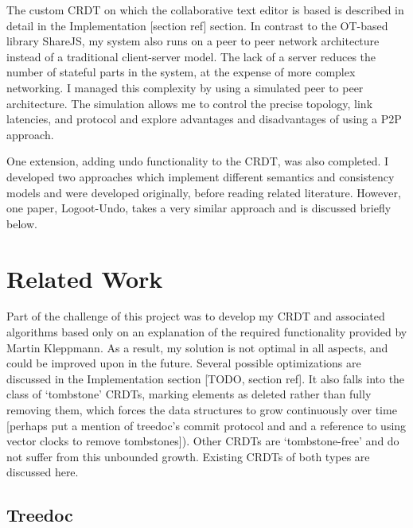\documentclass[12pt,a4paper,twoside,openright]{report}
\begin{document}
The custom CRDT on which the collaborative text editor is based is described in detail in the Implementation [section ref] section. In contrast to the OT-based library ShareJS, my system also runs on a peer to peer network architecture instead of a traditional client-server model. The lack of a server reduces the number of stateful parts in the system, at the expense of more complex networking. I managed this complexity by using a simulated peer to peer architecture. The simulation allows me to control the precise topology, link latencies, and protocol and explore advantages and disadvantages of using a P2P approach. 

One extension, adding undo functionality to the CRDT, was also completed. I developed two approaches which implement different semantics and consistency models and were developed originally, before reading related literature. However, one paper, Logoot-Undo, takes a very similar approach and is discussed briefly below.

\section{Related Work}

Part of the challenge of this project was to develop my CRDT and associated algorithms based only on an explanation of the required functionality provided by Martin Kleppmann. As a result, my solution is not optimal in all aspects, and could be improved upon in the future. Several possible optimizations are discussed in the Implementation section [TODO, section ref]. It also falls into the class of `tombstone' CRDTs, marking elements as deleted rather than fully removing them, which forces the data structures to grow continuously over time [perhaps put a mention of treedoc's commit protocol and and a reference to using vector clocks to remove tombstones]). Other CRDTs are `tombstone-free' and do not suffer from this unbounded growth. Existing CRDTs of both types are discussed here.

\subsection{Treedoc}
\end{document}
